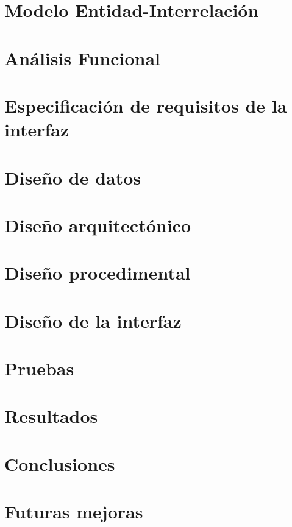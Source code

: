 \documentclass[a4paper,10pt,draft]{article}
\begin{document}
   \section{Modelo Entidad-Interrelación}

   \section{Análisis Funcional}

   \section{Especificación de requisitos de la interfaz}

   \section{Diseño de datos}

   \section{Diseño arquitectónico}

   \section{Diseño procedimental}

   \section{Diseño de la interfaz}

   \section{Pruebas}

   \section{Resultados}

   \section{Conclusiones}

   \section{Futuras mejoras}
\end{document}
